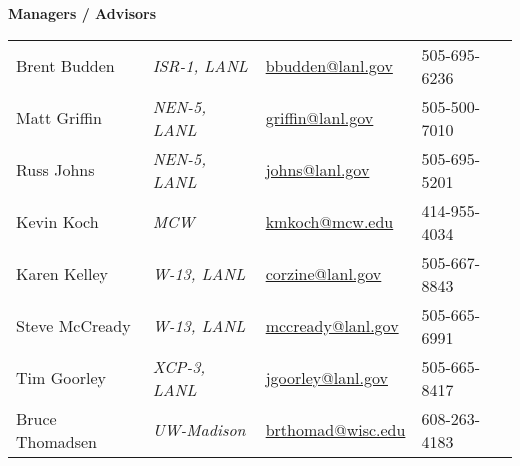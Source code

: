 
\begin{minipage}{0.50\textwidth} \footnotesize
\begin{center}
{\normalsize \textbf{Managers / Advisors}}
\end{center}
\begin{tabular}{llll|}
Brent Budden &  \textit{ISR-1, LANL} &  \href{mailto:bbudden@lanl.gov}{bbudden@lanl.gov} & 505-695-6236 \\
Matt Griffin &  \textit{NEN-5, LANL}  &  \href{mailto:griffin@lanl.gov}{griffin@lanl.gov} & 505-500-7010 \\
Russ Johns &  \textit{NEN-5, LANL} &  \href{mailto:johns@lanl.gov}{johns@lanl.gov} & 505-695-5201 \\
Kevin Koch & \textit{MCW} & \href{mailto:kmkoch@mcw.edu}{kmkoch@mcw.edu} & 414-955-4034 \\
Karen Kelley &  \textit{W-13, LANL} & \href{mailto:corzine@lanl.gov}{corzine@lanl.gov} & 505-667-8843 \\
Steve McCready & \textit{W-13, LANL} & \href{mailto:mccready@lanl.gov}{mccready@lanl.gov} & 505-665-6991 \\
Tim Goorley & \textit{XCP-3, LANL} &\href{mailto:jgoorley@lanl.gov}{jgoorley@lanl.gov} & 505-665-8417 \\
Bruce Thomadsen & \textit{UW-Madison} & \href{mailto:brthomad@wisc.edu}{brthomad@wisc.edu} &  608-263-4183 \\
\end{tabular}
\end{minipage}%
